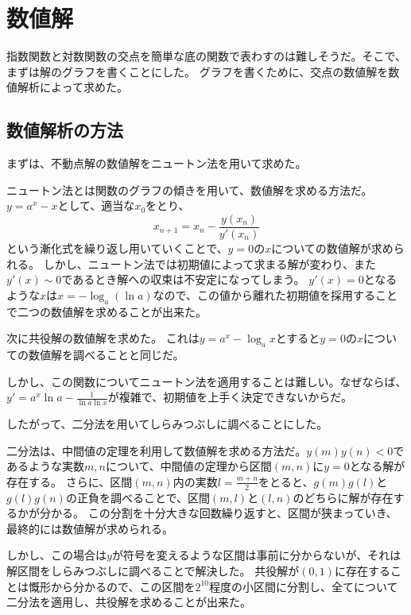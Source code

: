 \section{数値解}
	指数関数と対数関数の交点を簡単な底の関数で表わすのは難しそうだ。そこで、まずは解のグラフを書くことにした。
	グラフを書くために、交点の数値解を数値解析によって求めた。

\subsection{数値解析の方法}
	まずは、不動点解の数値解をニュートン法を用いて求めた。

	ニュートン法とは関数のグラフの傾きを用いて、数値解を求める方法だ。$y=a^x-x$として、適当な$x_0$をとり、
	\[
		x_{n+1} = x_n - \frac{y(x_n)}{y'(x_n)}
	\]
	という漸化式を繰り返し用いていくことで、$y=0$の$x$についての数値解が求められる。
	しかし、ニュートン法では初期値によって求まる解が変わり、また$y'(x) \sim 0$であるとき解への収束は不安定になってしまう。
	$y'(x) = 0$となるような$x$は$x = -\log_{a} \left(\ln{a}\right)$なので、この値から離れた初期値を採用することで二つの数値解を求めることが出来た。

	次に共役解の数値解を求めた。
	これは$y = a^{x} - \log_{a} x$とすると$y=0$の$x$についての数値解を調べることと同じだ。

	しかし、この関数についてニュートン法を適用することは難しい。なぜならば、$y' = a^{x}\ln{a} - \frac{1}{\ln{a}\ln{x}}$が複雑で、初期値を上手く決定できないからだ。

	したがって、二分法を用いてしらみつぶしに調べることにした。

	二分法は、中間値の定理を利用して数値解を求める方法だ。$y(m)y(n) < 0$であるような実数$m,n$について、中間値の定理から区間$(m,n)$に$y = 0$となる解が存在する。
	さらに、区間$(m,n)$内の実数$l = \frac{m+n}{2}$をとると、$g(m)g(l)$と$g(l)g(n)$の正負を調べることで、区間$(m,l)$と$(l,n)$のどちらに解が存在するかが分かる。
	この分割を十分大きな回数繰り返すと、区間が狭まっていき、最終的には数値解が求められる。

	しかし、この場合は$y$が符号を変えるような区間は事前に分からないが、それは解区間をしらみつぶしに調べることで解決した。
	共役解が$(0,1)$に存在することは慨形から分かるので、この区間を$2^{10}$程度の小区間に分割し、全てについて二分法を適用し、共役解を求めることが出来た。

